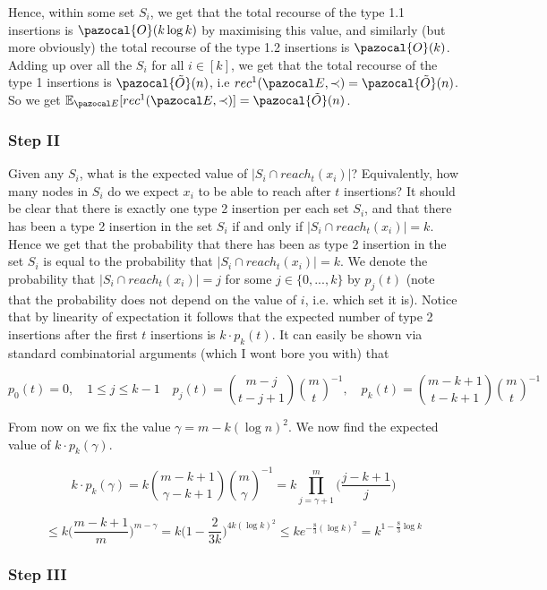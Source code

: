 \documentclass{report}
\begin{document}
Hence, within some set $S_{i}$, we get that the total recourse of the type 1.1 insertions is $\pazocal{O}(k \log k)$ by maximising this value, and similarly (but more obviously) the total recourse of the type 1.2 insertions is $\pazocal{O}(k)$. Adding up over all the $S_{i}$ for all $i \in [k]$, we get that the total recourse of the type 1 insertions is $\pazocal{\tilde{O}}(n)$, i.e $rec^1(\pazocal E, \prec)=\pazocal{\tilde{O}}(n)$. So we get $\mathbb E_{\pazocal E}[rec^1(\pazocal E, \prec)]=\pazocal{\tilde{O}}(n)$.

\subsubsection{Step II}

Given any $S_{i}$, what is the expected value of $\vert S_{i} \cap reach_t(x_{i})\vert$? Equivalently, how many nodes in $S_{i}$ do we expect $x_{i}$ to be able to reach after $t$ insertions? It should be clear that there is exactly one type 2 insertion per each set $S_{i}$, and that there has been a type 2 insertion in the set $S_{i}$ if and only if $\vert S_{i} \cap reach_t(x_{i})\vert = k$. Hence we get that the probability that there has been as type 2 insertion in the set $S_{i}$ is equal to the probability that $\vert S_{i} \cap reach_t(x_{i})\vert = k$. We denote the probability that $\vert S_{i} \cap reach_t(x_{i})\vert = j$ for some $j \in \{0,...,k\}$ by $p_{j}(t)$ (note that the probability does not depend on the value of $i$, i.e. which set it is). Notice that by linearity of expectation it follows that the expected number of type 2 insertions after the first $t$ insertions is $k \cdot p_k(t)$. It can easily be shown via standard combinatorial arguments (which I wont bore you with) that 

\[ p_{0}(t) = 0,   \quad 1 \leq j \leq k-1 \quad p_{j}(t) = \binom{m-j}{t-j+1}\binom{m}{t}^{-1}, \quad p_{k}(t) = \binom{m-k+1}{t-k+1}\binom{m}{t}^{-1} \]

From now on we fix the value $\gamma=m-k(\log n)^2$. We now find the expected value of $k \cdot p_{k}(\gamma)$.

\[k \cdot p_{k}(\gamma) = k\binom{m-k+1}{\gamma-k+1}\binom{m}{\gamma}^{-1} = k\prod_{j=\gamma + 1}^{m} \bigg( \frac{j-k+1}{j} \bigg) \] 

\[ \leq k \bigg(\frac{m-k+1}{m}\bigg)^{m-\gamma} = k\bigg(1 - \frac{2}{3k}\bigg)^{4k (\log k)^2} \leq ke^{-\frac{8}{3}(\log k)^2} = k^{1-\frac{8}{3}\log k}\] 

\subsubsection{Step III}
\end{document}
